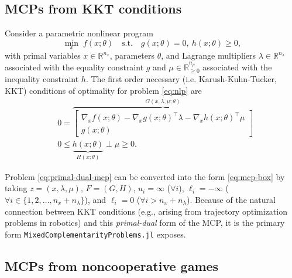 \documentclass[conference]{IEEEtran}
\begin{document}
\subsection{MCPs from KKT conditions}
\label{sec:background:kkt}

Consider a parametric nonlinear program
\begin{equation}
  \min_{x} \; f(x;\theta) \quad \text{s.t.} \quad g(x; \theta) = 0,~ h(x;\theta) \ge 0,
  \label{eq:nlp}
\end{equation}
with primal variables $x\in\mathbb{R}^{n_x}$, parameters $\theta$, and Lagrange
multipliers $\lambda \in \mathbb{R}^{n_\lambda}$ associated with the equality constraint $g$ and $\mu \in\mathbb{R}_{\ge 0}^{n_\mu}$ associated with the inequality constraint $h$. The first order necessary (i.e. Karush-Kuhn-Tucker, KKT) conditions of optimality for problem
\cref{eq:nlp} are
\begin{subequations}
  \label{eq:primal-dual-mcp}
  \begin{align}
    &0 = \overbrace{\begin{bmatrix}
    \nabla_x f(x;\theta) - \nabla_x g(x; \theta)^\top \lambda - \nabla_x h(x;\theta)^\top \mu\\
    g(x; \theta)
    \end{bmatrix}}^{G(x,\lambda, \mu;\theta)}  \\
    &0 \le \underbrace{h(x; \theta)}_{H(x;\theta)} \perp \mu \ge 0.
  \end{align}
\end{subequations}

Problem \cref{eq:primal-dual-mcp} can be converted into the form \cref{eq:mcp-box} by taking $z=(x,\lambda,\mu)$, $F = (G, H)$, $u_i = \infty$ ($\forall i$), $\ell_i = -\infty$ ($\forall i \in \{1, 2, \dots, n_x + n_\lambda\}$), and $\ell_i = 0$ ($\forall i > n_x + n_\lambda$).
Because of the natural connection between KKT conditions (e.g., arising from trajectory optimization problems in robotics) and this \emph{primal-dual} form of the MCP, it is the primary form
\texttt{MixedComplementarityProblems.jl} exposes.

\subsection{MCPs from noncooperative games}
\label{sec:background:games}
\end{document}
